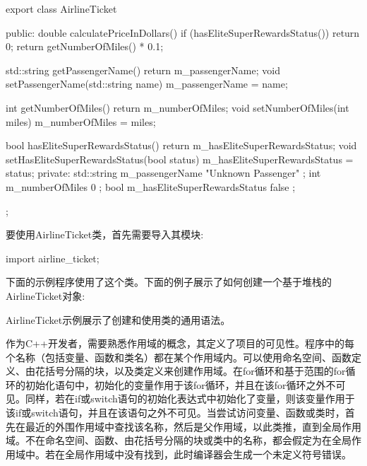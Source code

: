 \begin{cpp}
export class AirlineTicket
{
    public:
        double calculatePriceInDollars()
        {
            if (hasEliteSuperRewardsStatus()) { return 0; }
            return getNumberOfMiles() * 0.1;
        }

        std::string getPassengerName() { return m_passengerName; }
        void setPassengerName(std::string name) { m_passengerName = name; }

        int getNumberOfMiles() { return m_numberOfMiles; }
        void setNumberOfMiles(int miles) { m_numberOfMiles = miles; }

        bool hasEliteSuperRewardsStatus() { return m_hasEliteSuperRewardsStatus; }
        void setHasEliteSuperRewardsStatus(bool status)
        {
            m_hasEliteSuperRewardsStatus = status;
        }
    private:
        std::string m_passengerName { "Unknown Passenger" };
        int m_numberOfMiles { 0 };
        bool m_hasEliteSuperRewardsStatus { false };
};
\end{cpp}


要使用AirlineTicket类，首先需要导入其模块:

\begin{cpp}
import airline_ticket;
\end{cpp}

下面的示例程序使用了这个类。下面的例子展示了如何创建一个基于堆栈的AirlineTicket对象:


AirlineTicket示例展示了创建和使用类的通用语法。


作为C++开发者，需要熟悉作用域的概念，其定义了项目的可见性。程序中的每个名称（包括变量、函数和类名）都在某个作用域内。可以使用命名空间、函数定义、由花括号分隔的块，以及类定义来创建作用域。在for循环和基于范围的for循环的初始化语句中，初始化的变量作用于该for循环，并且在该for循环之外不可见。同样，若在if或switch语句的初始化表达式中初始化了变量，则该变量作用于该if或switch语句，并且在该语句之外不可见。当尝试访问变量、函数或类时，首先在最近的外围作用域中查找该名称，然后是父作用域，以此类推，直到全局作用域。不在命名空间、函数、由花括号分隔的块或类中的名称，都会假定为在全局作用域中。若在全局作用域中没有找到，此时编译器会生成一个未定义符号错误。

